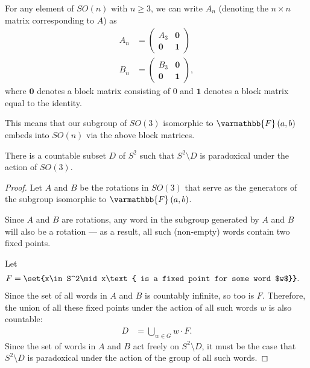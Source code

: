\documentclass[10pt]{mypackage}
\renewcommand*{\mathbb}[1]{\varmathbb{#1}}
\begin{document}
\begin{remark}
  For any element of $SO(n)$ with $n \geq 3$, we can write $A_n$ (denoting the $n\times n$ matrix corresponding to $A$) as
  \begin{align*}
    A_n &= 
    \begin{pmatrix}
      A_3 & \mathbf{0}\\
      \mathbf{0} & \mathbf{1}
    \end{pmatrix}\\
    B_n &= \begin{pmatrix}B_3 & \mathbf{0}\\ \mathbf{0} & \mathbf{1}\end{pmatrix},
  \end{align*}
  where $\mathbf{0}$ denotes a block matrix consisting of $0$ and $\mathbf{1}$ denotes a block matrix equal to the identity.\newline

  This means that our subgroup of $SO(3)$ isomorphic to $\mathbb{F}\left(a,b\right)$ embeds into $SO(n)$ via the above block matrices.
\end{remark}
\begin{theorem}
  There is a countable subset $D$ of $S^2$ such that $S^2\setminus D$ is paradoxical under the action of $SO(3)$.
\end{theorem}
\begin{proof}
  Let $A$ and $B$ be the rotations in $SO(3)$ that serve as the generators of the subgroup isomorphic to $\mathbb{F}\left(a,b\right)$.\newline

  Since $A$ and $B$ are rotations, any word in the subgroup generated by $A$ and $B$ will also be a rotation --- as a result, all such (non-empty) words contain two fixed points.\newline

  Let
  \begin{align*}
    F &= \set{x\in S^2\mid x\text{ is a fixed point for some word $w$}}.
  \end{align*}
  Since the set of all words in $A$ and $B$ is countably infinite, so too is $F$. Therefore, the union of all these fixed points under the action of all such words $w$ is also countable:
  \begin{align*}
    D &= \bigcup_{w\in G} w\cdot F.
  \end{align*}
  Since the set of words in $A$ and $B$ act freely on $S^2\setminus D$, it must be the case that $S^{2}\setminus D$ is paradoxical under the action of the group of all such words.
\end{proof}
\end{document}
